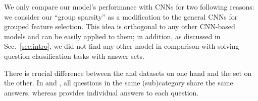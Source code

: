 











We only compare our model's performance with CNNs for two following reasons: we consider our ``group sparsity''
as a modification to the general CNNs for grouped feature selection. 
This idea is orthogonal to any other CNN-based models and 
can be easily applied to them; 
in addition, as discussed in Sec.~\ref{sec:intro}, 
we did not find any other model in comparison with solving question classification tasks with answer sets.


There is crucial difference between the \Insurance and \DMV datasets on one hand and the \Yahoo set on the other.
In \Insurance and \DMV, all questions in the same (sub)category share the same answers,
whereas \Yahoo provides individual answers to each question.

